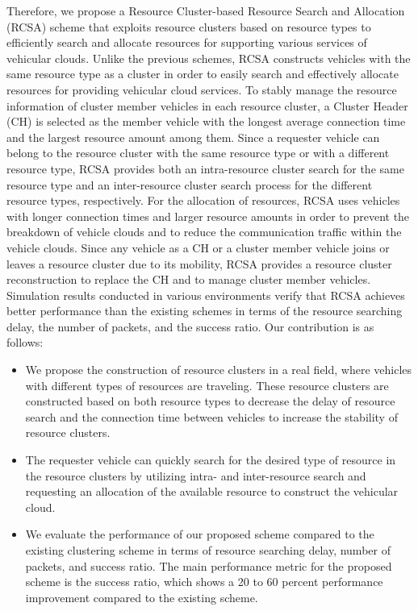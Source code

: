 \documentclass[sensors,article,accept,moreauthors,pdftex]{Definitions/mdpi}
\begin{document}
Therefore, we propose a Resource Cluster-based Resource Search and Allocation (RCSA) scheme that exploits resource clusters based on resource types to efficiently search and allocate resources for supporting various services of vehicular clouds. 
Unlike the previous schemes, RCSA constructs vehicles with the same resource type as a cluster in order to easily search and effectively allocate resources for providing vehicular cloud services. 
To stably manage the resource information of cluster member vehicles in each resource cluster, a Cluster Header (CH) is selected as the member vehicle with the longest average connection time and the largest resource amount among them.
Since a requester vehicle can belong to the resource cluster with the same resource type or with a different resource type, RCSA provides both an intra-resource cluster search for the same resource type and an inter-resource cluster search process for the different resource types, respectively.
For the allocation of resources, RCSA uses vehicles with longer connection times and larger resource amounts in order to prevent the breakdown of vehicle clouds and to reduce the communication traffic within the vehicle clouds.
Since any vehicle as a CH or a cluster member vehicle joins or leaves a resource cluster due to its mobility, RCSA provides a resource cluster reconstruction to replace the CH and to manage cluster member vehicles.
Simulation results conducted in various environments verify that RCSA achieves better performance than the existing schemes in terms of the resource searching delay, the number of packets, and the success ratio.
Our contribution is as follows:

\begin{itemize}
    \item We propose the construction of resource clusters in a real field, where vehicles with different types of resources are traveling. These resource clusters are constructed based on both resource types to decrease the delay of resource search and the connection time between vehicles to increase the stability of resource clusters.
    \item The requester vehicle can quickly search for the desired type of resource in the resource clusters by utilizing intra- and inter-resource search and requesting an allocation of the available resource to construct the vehicular cloud.
    \item We evaluate the performance of our proposed scheme compared to the existing clustering scheme in terms of resource searching delay, number of packets, and success ratio. The main performance metric for the proposed scheme is the success ratio, which shows a 20 to 60 percent performance improvement compared to the existing scheme.
\end{itemize}
\end{document}
